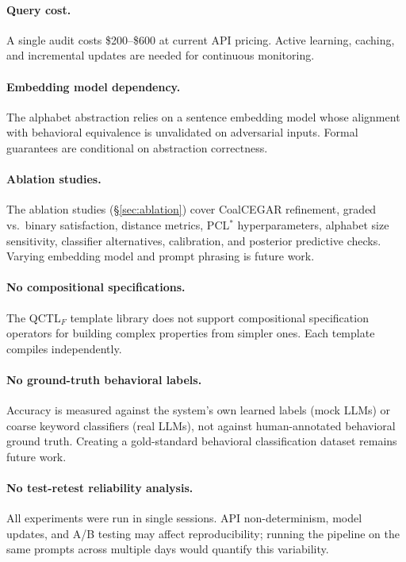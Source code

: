 \documentclass[11pt]{article}
\newcommand{\pclstar}{PCL$^*$}
\newcommand{\qctlf}{QCTL$_F$}
\begin{document}
\paragraph{Query cost.}
A single audit costs \$200--\$600 at current API pricing.  Active
learning, caching, and incremental updates are needed for continuous
monitoring.

\paragraph{Embedding model dependency.}
The alphabet abstraction relies on a sentence embedding model
whose alignment with behavioral equivalence is unvalidated on
adversarial inputs.  Formal guarantees are conditional on
abstraction correctness.

\paragraph{Ablation studies.}
The ablation studies (\S\ref{sec:ablation}) cover CoalCEGAR
refinement, graded vs.\ binary satisfaction, distance metrics,
\pclstar{} hyperparameters, alphabet size sensitivity,
classifier alternatives, calibration, and posterior predictive
checks.  Varying embedding model and prompt phrasing is future work.

\paragraph{No compositional specifications.}
The \qctlf{} template library does not support compositional
specification operators for building complex properties from simpler
ones.  Each template compiles independently.

\paragraph{No ground-truth behavioral labels.}
Accuracy is measured against the system's own learned labels (mock
LLMs) or coarse keyword classifiers (real LLMs), not against
human-annotated behavioral ground truth.  Creating a gold-standard
behavioral classification dataset remains future work.

\paragraph{No test-retest reliability analysis.}
All experiments were run in single sessions.  API non-determinism,
model updates, and A/B testing may affect reproducibility; running
the pipeline on the same prompts across multiple days would quantify
this variability.
\end{document}

